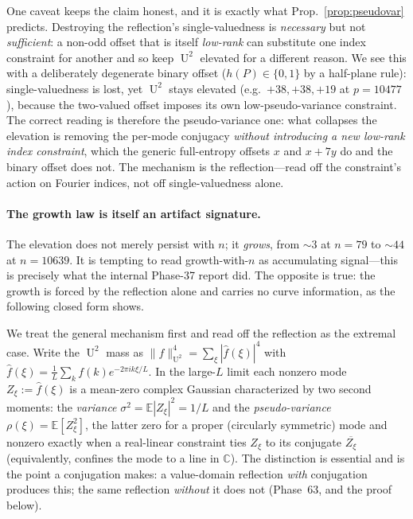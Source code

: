 \documentclass[11pt]{article}
\theoremstyle{definition}
\DeclareMathOperator{\Uk}{U}
\begin{document}
One caveat keeps the claim honest, and it is exactly what
Prop.~\ref{prop:pseudovar} predicts. Destroying the reflection's
single-valuedness is \emph{necessary} but not \emph{sufficient}: a
non-odd offset that is itself \emph{low-rank} can substitute one index
constraint for another and so keep $\Uk^2$ elevated for a different
reason. We see this with a deliberately degenerate binary offset
($h(P)\in\{0,1\}$ by a half-plane rule): single-valuedness is lost, yet
$\Uk^2$ stays elevated (e.g.\ $+38,+38,+19$ at $p=10477$), because the
two-valued offset imposes its own low-pseudo-variance constraint. The
correct reading is therefore the pseudo-variance one: what collapses the
elevation is removing the per-mode conjugacy \emph{without introducing a
new low-rank index constraint}, which the generic full-entropy offsets
$x$ and $x+7y$ do and the binary offset does not. The mechanism is the
reflection---read off the constraint's action on Fourier indices, not off
single-valuedness alone.

\paragraph{The growth law is itself an artifact signature.} The elevation
does not merely persist with $n$; it \emph{grows}, from $\sim3$ at $n=79$
to $\sim44$ at $n=10639$. It is tempting to read growth-with-$n$ as
accumulating signal---this is precisely what the internal Phase-37 report
did. The opposite is true: the growth is forced by the reflection alone
and carries no curve information, as the following closed form shows.

We treat the general mechanism first and read off the reflection as the
extremal case. Write the $\Uk^2$ mass as
$\|f\|_{\Uk^2}^4=\sum_\xi|\hat f(\xi)|^4$ with
$\hat f(\xi)=\tfrac1L\sum_k f(k)e^{-2\pi ik\xi/L}$. In the large-$L$ limit
each nonzero mode $Z_\xi:=\hat f(\xi)$ is a mean-zero complex Gaussian
characterized by two second moments: the \emph{variance}
$\sigma^2=\mathbb E|Z_\xi|^2=1/L$ and the \emph{pseudo-variance}
$\rho(\xi)=\mathbb E[Z_\xi^2]$, the latter zero for a proper
(circularly symmetric) mode and nonzero exactly when a real-linear
constraint ties $Z_\xi$ to its conjugate $\overline{Z_\xi}$ (equivalently,
confines the mode to a line in $\mathbb C$). The distinction is essential
and is the point a conjugation makes: a value-domain reflection
\emph{with} conjugation produces this; the same reflection \emph{without}
it does not (Phase~63, and the proof below).
\end{document}
